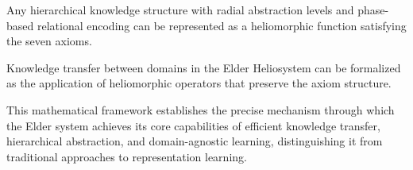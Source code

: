 \begin{theorem}
Any hierarchical knowledge structure with radial abstraction levels and phase-based relational encoding can be represented as a heliomorphic function satisfying the seven axioms.
\end{theorem}

\begin{corollary}
Knowledge transfer between domains in the Elder Heliosystem can be formalized as the application of heliomorphic operators that preserve the axiom structure.
\end{corollary}

This mathematical framework establishes the precise mechanism through which the Elder system achieves its core capabilities of efficient knowledge transfer, hierarchical abstraction, and domain-agnostic learning, distinguishing it from traditional approaches to representation learning.